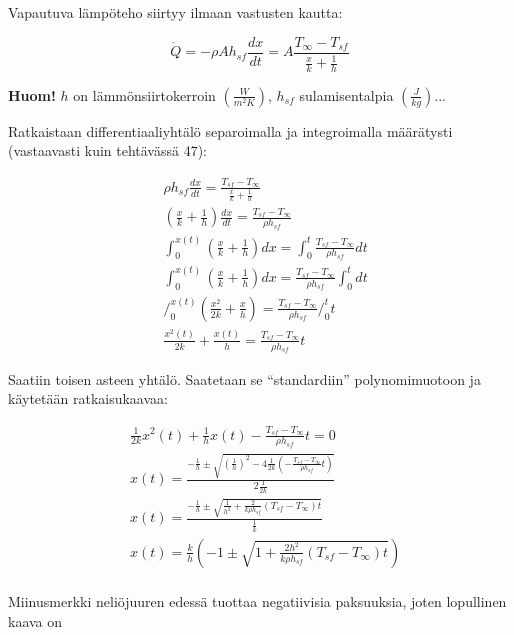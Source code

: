\documentclass[12pt,a4paper,finnish]{article}
\begin{document}
Vapautuva lämpöteho siirtyy ilmaan vastusten kautta:

\begin{equation}
 \dot{Q} = -\rho Ah_{sf}\frac{dx}{dt} = A\frac{T_{\infty} - T_{sf}}{\frac{x}{k} + \frac{1}{h}}
\end{equation}

\textbf{Huom!} $h$ on lämmönsiirtokerroin $\left(\frac{W}{m^2K}\right)$, $h_{sf}$ sulamisentalpia 
$\left(\frac{J}{kg}\right)$...

Ratkaistaan differentiaaliyhtälö separoimalla ja integroimalla määrätysti (vastaavasti kuin tehtävässä 47):

\begin{align}
 &\rho h_{sf}\frac{dx}{dt} = \frac{T_{sf} - T_{\infty}}{\frac{x}{k} + \frac{1}{h}}\\
 &\left(\frac{x}{k} + \frac{1}{h}\right) \frac{dx}{dt} = \frac{T_{sf} - T_{\infty}}{\rho h_{sf}}\\
 &\int_0^{x(t)} \left(\frac{x}{k} + \frac{1}{h}\right) dx = \int_0^t \frac{T_{sf} - T_{\infty}}{\rho h_{sf}}dt\\
 &\int_0^{x(t)} \left(\frac{x}{k} + \frac{1}{h}\right) dx = \frac{T_{sf} - T_{\infty}}{\rho h_{sf}} \int_0^t dt\\
 &\bigg/_0^{x(t)} \left(\frac{x^2}{2k} + \frac{x}{h}\right) = \frac{T_{sf} - T_{\infty}}{\rho h_{sf}} \bigg/_0^t t\\
 &\frac{x^2(t)}{2k} + \frac{x(t)}{h} = \frac{T_{sf} - T_{\infty}}{\rho h_{sf}}t
\end{align}

Saatiin toisen asteen yhtälö. Saatetaan se ``standardiin'' polynomimuotoon ja käytetään ratkaisukaavaa:

\begin{align}
 &\frac{1}{2k}x^2(t) + \frac{1}{h}x(t) - \frac{T_{sf} - T_{\infty}}{\rho h_{sf}}t = 0\\
 &x(t) = \frac{ -\frac{1}{h} \pm \sqrt{ \left(\frac{1}{h}\right)^2 
  - 4\frac{1}{2k}\left(-\frac{T_{sf} - T_{\infty}}{\rho h_{sf}}t\right)}}{2\frac{1}{2k}}\\
 &x(t) = \frac{ -\frac{1}{h} \pm \sqrt{ \frac{1}{h^2} 
  + \frac{2}{k\rho h_{sf}}(T_{sf} - T_{\infty})t}}{\frac{1}{k}}\\
 &x(t) = \frac{k}{h}\left( -1 \pm \sqrt{ 1 
  + \frac{2h^2}{k\rho h_{sf}}(T_{sf} - T_{\infty})t}\right)\\
\end{align}

Miinusmerkki neliöjuuren edessä tuottaa negatiivisia paksuuksia, joten lopullinen kaava on
\end{document}
